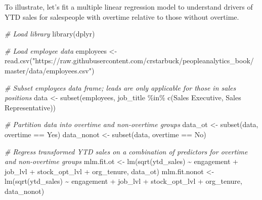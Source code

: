 \documentclass[
]{book}
\newenvironment{Shaded}{\begin{snugshade}}{\end{snugshade}}
\newcommand{\CommentTok}[1]{\textcolor[rgb]{0.56,0.35,0.01}{\textit{#1}}}
\newcommand{\FunctionTok}[1]{\textcolor[rgb]{0.00,0.00,0.00}{#1}}
\newcommand{\NormalTok}[1]{#1}
\newcommand{\OtherTok}[1]{\textcolor[rgb]{0.56,0.35,0.01}{#1}}
\newcommand{\SpecialCharTok}[1]{\textcolor[rgb]{0.00,0.00,0.00}{#1}}
\newcommand{\StringTok}[1]{\textcolor[rgb]{0.31,0.60,0.02}{#1}}
\begin{document}
To illustrate, let's fit a multiple linear regression model to understand drivers of YTD sales for salespeople with overtime relative to those without overtime.

\begin{Shaded}
\begin{Highlighting}[]
\CommentTok{\# Load library}
\FunctionTok{library}\NormalTok{(dplyr)}

\CommentTok{\# Load employee data}
\NormalTok{employees }\OtherTok{\textless{}{-}} \FunctionTok{read.csv}\NormalTok{(}\StringTok{"https://raw.githubusercontent.com/crstarbuck/peopleanalytics\_book/master/data/employees.csv"}\NormalTok{)}

\CommentTok{\# Subset employees data frame; leads are only applicable for those in sales positions}
\NormalTok{data }\OtherTok{\textless{}{-}} \FunctionTok{subset}\NormalTok{(employees, job\_title }\SpecialCharTok{\%in\%} \FunctionTok{c}\NormalTok{(}\StringTok{\textquotesingle{}Sales Executive\textquotesingle{}}\NormalTok{, }\StringTok{\textquotesingle{}Sales Representative\textquotesingle{}}\NormalTok{))}

\CommentTok{\# Partition data into overtime and non{-}overtime groups}
\NormalTok{data\_ot }\OtherTok{\textless{}{-}} \FunctionTok{subset}\NormalTok{(data, overtime }\SpecialCharTok{==} \StringTok{\textquotesingle{}Yes\textquotesingle{}}\NormalTok{)}
\NormalTok{data\_nonot }\OtherTok{\textless{}{-}} \FunctionTok{subset}\NormalTok{(data, overtime }\SpecialCharTok{==} \StringTok{\textquotesingle{}No\textquotesingle{}}\NormalTok{)}

\CommentTok{\# Regress transformed YTD sales on a combination of predictors for overtime and non{-}overtime groups}
\NormalTok{mlm.fit.ot }\OtherTok{\textless{}{-}} \FunctionTok{lm}\NormalTok{(}\FunctionTok{sqrt}\NormalTok{(ytd\_sales) }\SpecialCharTok{\textasciitilde{}}\NormalTok{ engagement }\SpecialCharTok{+}\NormalTok{ job\_lvl }\SpecialCharTok{+}\NormalTok{ stock\_opt\_lvl }\SpecialCharTok{+}\NormalTok{ org\_tenure, data\_ot)}
\NormalTok{mlm.fit.nonot }\OtherTok{\textless{}{-}} \FunctionTok{lm}\NormalTok{(}\FunctionTok{sqrt}\NormalTok{(ytd\_sales) }\SpecialCharTok{\textasciitilde{}}\NormalTok{ engagement }\SpecialCharTok{+}\NormalTok{ job\_lvl }\SpecialCharTok{+}\NormalTok{ stock\_opt\_lvl }\SpecialCharTok{+}\NormalTok{ org\_tenure, data\_nonot)}
\end{Highlighting}
\end{Shaded}
\end{document}
